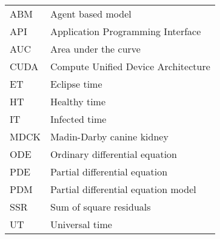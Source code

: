 \begin{center}
\begin{tabular}{ll}

ABM  & Agent based model\\
API  & Application Programming Interface\\
AUC  & Area under the curve\\
CUDA & Compute Unified Device Architecture\\
ET   & Eclipse time\\
HT   & Healthy time\\
IT   & Infected time\\
MDCK & Madin-Darby canine kidney\\
ODE  & Ordinary differential equation\\
PDE  & Partial differential equation\\
PDM  & Partial differential equation model\\
SSR  & Sum of square residuals\\
UT   & Universal time\\

\end{tabular}
\end{center}
